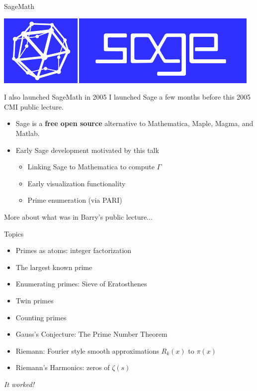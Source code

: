 \documentclass{beamer}
\begin{document}
\begin{frame}{SageMath}
  \vfill
  \begin{center}
    \includegraphics[width=.7\textwidth]{pics/sage-logo}
  \end{center}
  \vfill

  \begin{block}{I also launched SageMath in 2005}
    I launched Sage a few months before this 2005 CMI public lecture.
    \begin{itemize}
      \item Sage is a {\bf free open source} alternative to Mathematica, Maple, Magma, and Matlab.
      \item Early Sage development motivated by this talk
            \begin{itemize}
              \item Linking Sage to Mathematica to compute $\Gamma$
              \item Early visualization functionality
              \item Prime enumeration (via PARI)
            \end{itemize}
    \end{itemize}
  \end{block}
\end{frame}

\begin{frame}{More about what was in Barry's public lecture...}
  \begin{block}{Topics}
    \begin{itemize}
      \item Primes as atoms: integer factorization
      \item The largest known prime
      \item Enumerating primes: Sieve of Eratosthenes
      \item Twin primes
      \item Counting primes
      \item Gauss's Conjecture: The Prime Number Theorem
      \item Riemann: Fourier style smooth approximations $R_k(x)$ to $\pi(x)$
      \item Riemann's Harmonics: zeros of $\zeta(s)$
    \end{itemize}

  \end{block}

  \vfill
  \begin{center}
    \Large
    \emph{It worked!}
  \end{center}



\end{frame}
\end{document}
